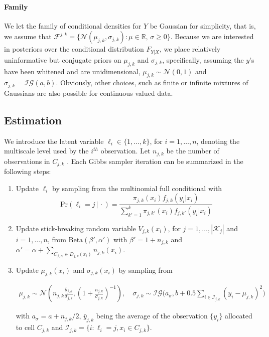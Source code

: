 \documentclass{article} %
\newcommand{\Real}{\mathbb{R}}
\providecommand{\mc}[1]{\mathcal{#1}}
\newcommand{\dd}[1]{{\color{blue}{\it #1}}}
\begin{document}
\paragraph{Family} We let the family of conditional densities for $Y$ be Gaussian for simplicity, that is, we assume that $\mc{F}^{j,k}=\{\mc{N}(\mu_{j,k}, {\sigma}_{j,k}) : \mu \in \Real, \, \sigma \geq 0\}$. Because we are interested in posteriors over the conditional distribution $F_{Y|X}$, we place relatively uninformative but conjugate priors on $\mu_{j,k}$ and ${\sigma}_{j,k}$, specifically, assuming the $y$'s have been whitened and are unidimensional,  
${\mu}_{j,k} \sim \mc{N}(0,1)$ and ${\sigma}_{j,k}=\mc{IG}(a,b)$.  
Obviously, other choices, such as finite or infinite mixtures of Gaussians are also possible for continuous valued data.  




\subsection{Estimation}



We introduce the latent variable $\ell_i \in \{1,\ldots,k\}$, for $i=1,\ldots,n$, denoting the multiscale level used by the $i^{th}$ observation.  
Let $n_{j,k}$ be  the number of observations in $C_{j,k}$ . Each Gibbs sampler iteration can be summarized in the following steps:
\dd{can this be checked carefully?}

\begin{enumerate}
\item Update $\ell_i$ by sampling from the multinomial full conditional with 
\[\mbox{Pr}( \ell_i = j\, |\, \cdot) = \frac{ \pi_{j,k}(x_i)f_{j,k}(y_i|x_i) }{ \sum_{k'=1}^k \pi_{j,k'}(x_i)f_{j,k'}(y_i | x_i) } \label{eq:prS}\]

\item Update stick-breaking random variable $V_{j,k}(x_i)$, for $j=1, \ldots, |\mc{K}_j|$ and $i=1, \ldots, n$, from $\mbox{Beta}(\beta',\alpha')$ with $\beta'=1+n_{j,k}$ and $\alpha'=\alpha+\sum_{C_{j,K} \in D_{j,k}(x_i)} n_{j,k}(x_i)$.

\item Update $\mu_{j,k}(x_i)$ and $\sigma_{j,k}(x_i)$ by sampling from

\begin{align*}
	\mu_{j,k} \sim \mc{N}\left(n_{j,k}\frac{\bar{y}_{j,k}}{ \sigma_{j,k}} , (1+\frac{n_{j,k}}{\sigma_{j,k}})^{-1}\right), \quad
	 \sigma_{j,k} \sim \mc{IG}\bigg(a_{\sigma},b+0.5\sum_{i \in \mc{I}_{j,k}} \left(y_{i}-\mu_{j,k}\right)^2\bigg)	
\end{align*}

with $a_{\sigma}=a+n_{j,k}/2$, $\bar{y}_{j,k}$ being the average of the observation $\{y_i\}$ allocated to cell $C_{j,k}$ and $\mc{I}_{j,k}=\{i : \ell_i=j, x_i \in C_{j,k}\}$.

\end{enumerate}
\end{document}
